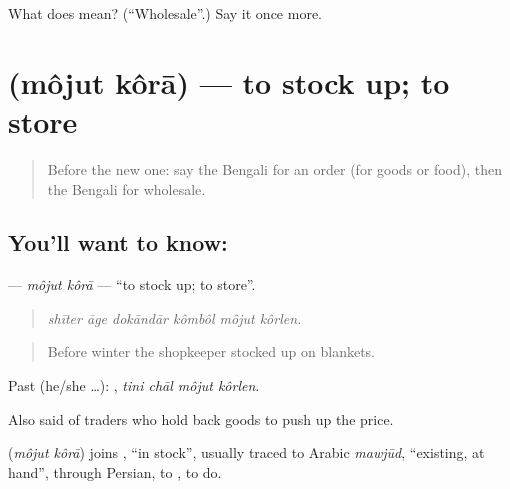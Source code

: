 \begin{tcolorbox}[breakable,colback=teal!4,colframe=teal!35!black,title={Before you move on}]
What does  mean? (\textquotedblleft{}Wholesale\textquotedblright{}.) Say it once more.
\end{tcolorbox}
\section[\texorpdfstring{\bn{মজুত} \bn{করা} (môjut kôrā)}{মজুত করা (môjut kôrā)}]{  (môjut kôrā) — to stock up; to store}

\label{lesson:BN-C421-mojut-kora}



\begin{quote}
Before the new one: say the Bengali for an order (for goods or food), then the Bengali for wholesale.
\end{quote}

\subsection*{You'll want to know:  }
\textbf{ } — \emph{môjut kôrā} — \textquotedblleft{}to stock up; to store\textquotedblright{}.

\begin{quote}
     
\end{quote}

\begin{quote}
\emph{shīter āge dokāndār kômbôl môjut kôrlen.}
\end{quote}

\begin{quote}
Before winter the shopkeeper stocked up on blankets.
\end{quote}

Past (he/she …):    , \emph{tini chāl môjut kôrlen}.

Also said of traders who hold back goods to push up the price.

\begin{cousinweb}
\textbf{ } (\emph{môjut kôrā}) joins , \textquotedblleft{}in stock\textquotedblright{}, usually traced to Arabic \emph{mawjūd}, \textquotedblleft{}existing, at hand\textquotedblright{}, through Persian, to , to do.
\end{cousinweb}


